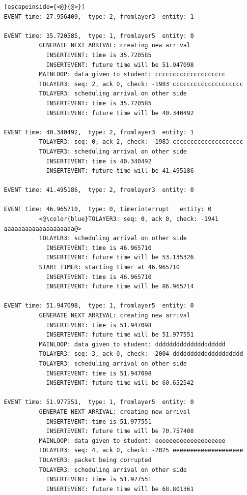 \documentclass[paper=a4, fontsize=11pt]{scrartcl}
\numberwithin{equation}{section}		%
\numberwithin{figure}{section}			%
\numberwithin{table}{section}				%
\begin{document}
\begin{lstlisting}[escapeinside={<@}{@>}]
EVENT time: 27.956409,  type: 2, fromlayer3  entity: 1

EVENT time: 35.720585,  type: 1, fromlayer5  entity: 0
          GENERATE NEXT ARRIVAL: creating new arrival
            INSERTEVENT: time is 35.720585
            INSERTEVENT: future time will be 51.947098
          MAINLOOP: data given to student: cccccccccccccccccccc
          TOLAYER3: seq: 2, ack 0, check: -1983 cccccccccccccccccccc
          TOLAYER3: scheduling arrival on other side
            INSERTEVENT: time is 35.720585
            INSERTEVENT: future time will be 40.340492

EVENT time: 40.340492,  type: 2, fromlayer3  entity: 1
          TOLAYER3: seq: 0, ack 2, check: -1983 cccccccccccccccccccc
          TOLAYER3: scheduling arrival on other side
            INSERTEVENT: time is 40.340492
            INSERTEVENT: future time will be 41.495186

EVENT time: 41.495186,  type: 2, fromlayer3  entity: 0

EVENT time: 46.965710,  type: 0, timerinterrupt   entity: 0
          <@\color{blue}TOLAYER3: seq: 0, ack 0, check: -1941 aaaaaaaaaaaaaaaaaaaa@>
          TOLAYER3: scheduling arrival on other side
            INSERTEVENT: time is 46.965710
            INSERTEVENT: future time will be 53.135326
          START TIMER: starting timer at 46.965710
            INSERTEVENT: time is 46.965710
            INSERTEVENT: future time will be 86.965714

EVENT time: 51.947098,  type: 1, fromlayer5  entity: 0
          GENERATE NEXT ARRIVAL: creating new arrival
            INSERTEVENT: time is 51.947098
            INSERTEVENT: future time will be 51.977551
          MAINLOOP: data given to student: dddddddddddddddddddd
          TOLAYER3: seq: 3, ack 0, check: -2004 dddddddddddddddddddd
          TOLAYER3: scheduling arrival on other side
            INSERTEVENT: time is 51.947098
            INSERTEVENT: future time will be 60.652542

EVENT time: 51.977551,  type: 1, fromlayer5  entity: 0
          GENERATE NEXT ARRIVAL: creating new arrival
            INSERTEVENT: time is 51.977551
            INSERTEVENT: future time will be 70.757408
          MAINLOOP: data given to student: eeeeeeeeeeeeeeeeeeee
          TOLAYER3: seq: 4, ack 0, check: -2025 eeeeeeeeeeeeeeeeeeee
          TOLAYER3: packet being corrupted
          TOLAYER3: scheduling arrival on other side
            INSERTEVENT: time is 51.977551
            INSERTEVENT: future time will be 68.801361


\end{lstlisting}
\end{document}
